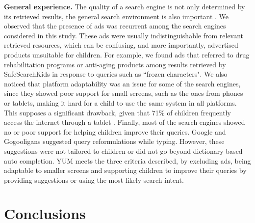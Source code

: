 \documentclass{sig-alternate-05-2015}
\begin{document}
\noindent
\textbf{General experience.} The quality of a search engine is not only determined by its retrieved results, the general search environment is also important \cite{Gos13}.  We observed that the presence of ads was recurrent among the search engines considered in this study. These ads were usually indistinguishable from relevant retrieved resources, which can be confusing, and more importantly, advertised products unsuitable for children. For example, we found ads that referred to drug rehabilitation programs or anti-aging products among results retrieved by SafeSearchKids in response to queries such as ``frozen characters". We also noticed that platform adaptability was an issue for some of the search engines, since they showed poor support for small screens, such as the ones from phones or tablets, making it hard for a child to use the same system in all platforms. This supposes a significant drawback, given that 71\% of children frequently access the internet through a tablet \cite{ofcom}. Finally, most of the search engines showed no or poor support for helping children improve their queries. Google and Gogooligans suggested query reformulations while typing. However, these suggestions were not tailored to children or did not go beyond dictionary based auto completion. YUM  meets the three criteria described, by excluding ads, being adaptable to smaller screens and supporting children to improve their queries by providing suggestions or using the most likely search intent.

\section{Conclusions}
\end{document}
